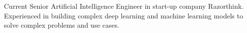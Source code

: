 

\begin{cvparagraph}

Current Senior Artificial Intelligence Engineer in start-up company Razorthink. Experienced in building complex deep learning and machine learning models to 
solve complex problems and use cases.
\end{cvparagraph}
